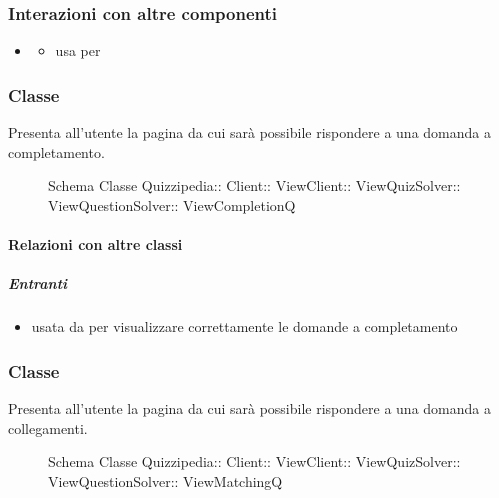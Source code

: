 \subsubsection{Interazioni con altre componenti}
\begin{itemize}
\item {}
\begin{itemize}
\item usa  per 
\end{itemize}
\end{itemize}
\subsubsection{Classe }
Presenta all'utente la pagina da cui sarà possibile rispondere a una domanda a completamento.
\begin{figure}[H]
\centering
\noindent{}
\caption[Schema Classe ViewCompletionQ]{Schema Classe Quizzipedia:: Client:: ViewClient:: ViewQuizSolver:: ViewQuestionSolver:: ViewCompletionQ}
\end{figure}
\paragraph{Relazioni con altre classi}
\subparagraph{Entranti}
\begin{itemize}
\item usata da  per visualizzare correttamente le domande a completamento
\end{itemize}
\subsubsection{Classe }
Presenta all'utente la pagina da cui sarà possibile rispondere a una domanda a collegamenti.
\begin{figure}[H]
\centering
\noindent{}
\caption[Schema Classe ViewMatchingQ]{Schema Classe Quizzipedia:: Client:: ViewClient:: ViewQuizSolver:: ViewQuestionSolver:: ViewMatchingQ}
\end{figure}
